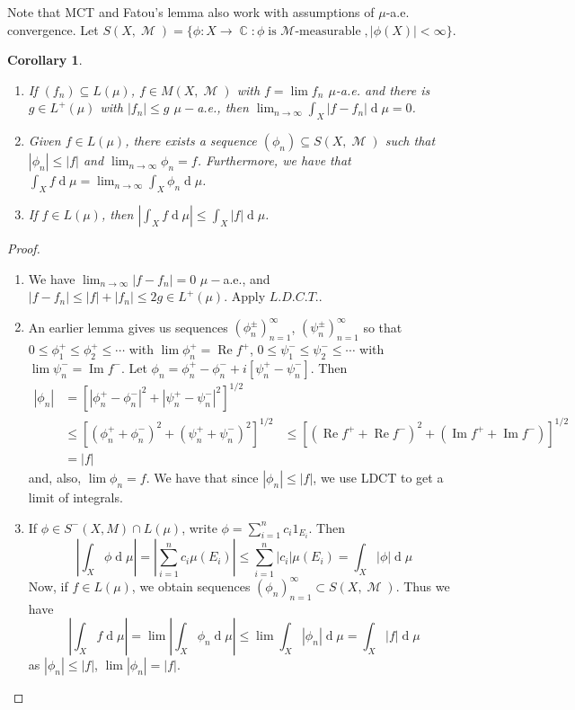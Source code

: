 \documentclass[12pt, a4paper]{memoir}
\DeclareMathOperator{\C}{{\mathbb{C}}}
\newtheorem{corollary}[theorem]{Corollary}
\theoremstyle{nonumberplain}
\newtheorem{proof}{Proof}
\DeclareMathOperator{\M}{\mathcal{M}}
\renewcommand{\Re}{\ensuremath{\operatorname{Re}}}
\renewcommand{\Im}{\ensuremath{\operatorname{Im}}}
\renewcommand{\d}[1]{\ensuremath{\operatorname{d}\!{#1}}} %
\begin{document}
Note that MCT and Fatou's lemma also work with assumptions of $\mu$-a.e. convergence.
Let $S(X,\M)=\{\phi:X\to\C:\phi\text{is $\M$-measurable},|\phi(X)|<\infty\}$.
\begin{corollary}
    \begin{enumerate}[nolistsep]
        \item If $(f_n)\subseteq L(\mu)$, $f\in M(X,\M)$ with $f=\lim f_n$ $\mu$-a.e. and there is $g\in L^+(\mu)$ with $|f_n|\leq g$ $\mu-$a.e., then $\lim_{n\to\infty}\int_X|f-f_n|\d{\mu}=0$.
        \item Given $f\in L(\mu)$, there exists a sequence $(\phi_n)\subseteq S(X,\M)$ such that $|\phi_n|\leq|f|$ and $\lim_{n\to\infty}\phi_n=f$.
            Furthermore, we have that $\int_Xf\d{\mu}=\lim_{n\to\infty}\int_X\phi_n\d{\mu}$.
        \item If $f\in L(\mu)$, then $|\int_Xf\d{\mu}|\leq\int_X|f|\d{\mu}$.
    \end{enumerate}
\end{corollary}
\begin{proof}
    \begin{enumerate}
        \item We have $\lim_{n\to\infty}|f-f_n|=0$ $\mu-$a.e., and $|f-f_n|\leq|f|+|f_n|\leq 2g\in L^+(\mu)$.
            Apply $L.D.C.T.$.
        \item An earlier lemma gives us sequences $(\phi_n^\pm)_{n=1}^\infty$, $(\psi_n^\pm)_{n=1}^\infty$ so that $0\leq\phi_1^+\leq\phi_2^+\leq\cdots$ with $\lim\phi_n^+=\Re f^+$, $0\leq\psi_1^-\leq\psi_2^-\leq\cdots$ with $\lim \psi_n^-=\Im f^-$.
            Let $\phi_n=\phi_n^+-\phi_n^-+i[\psi_n^+-\psi_n^-]$.
            Then
            \begin{align*}
                |\phi_n|&=[|\phi_n^+-\phi_n^-|^2+|\psi_n^+-\psi_n^-|^2]^{1/2}\\
                        &\leq[(\phi_n^++\phi_n^-)^2+(\psi_n^++\psi_n^-)^2]^{1/2}
                        &\leq\left[(\Re f^++\Re f^-)^2+(\Im f^++\Im f^-)\right]^{1/2}\\
                        &= |f|
            \end{align*}
            and, also, $\lim\phi_n=f$.
            We have that since $|\phi_n|\leq|f|$, we use LDCT to get a limit of integrals.
        \item If $\phi\in S^-(X,M)\cap L(\mu)$, write $\phi=\sum_{i=1}^nc_i1_{E_i}$.
            Then
            \begin{equation*}
                |\int_X\phi\d{\mu}|=|\sum_{i=1}^nc_i\mu(E_i)|\leq\sum_{i=1}^n|c_i|\mu(E_i)=\int_X|\phi|\d{\mu}
            \end{equation*}
            Now, if $f\in L(\mu)$, we obtain sequences $(\phi_n)_{n=1}^\infty\subset S(X,\M)$.
            Thus we have
            \begin{equation*}
                |\int_Xf\d{\mu}|=\lim|\int_X\phi_n\d{\mu}|\leq\lim\int_X|\phi_n|\d{\mu}=\int_X|f|\d{\mu}
            \end{equation*}
            as $|\phi_n|\leq|f|$, $\lim |\phi_n|=|f|$.
    \end{enumerate}
\end{proof}
\end{document}
